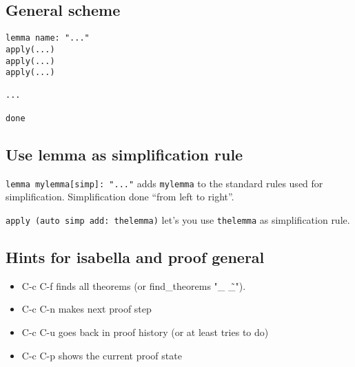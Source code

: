 \documentclass{article}
\begin{document}
\subsection{General scheme}
\begin{verbatim}
lemma name: "..."
apply(...)
apply(...)
apply(...)

...

done

\end{verbatim}

\subsection{Use lemma as simplification rule}

\texttt{lemma mylemma[simp]: "..."} adds \texttt{mylemma} to the standard rules used for simplification. Simplification done ``from left to right''.

\texttt{apply (auto simp add: thelemma)} let's you use \texttt{thelemma} as simplification rule.

\subsection {Hints for isabella and proof general}
\begin{itemize}
	\item C-c C-f finds all theorems (or find\_theorems "\_ \~ \_").
        \item C-c C-n makes next proof step
        \item C-c C-u goes back in proof history (or at least tries to do)
        \item C-c C-p shows the current proof state
\end{itemize}
\end{document}
